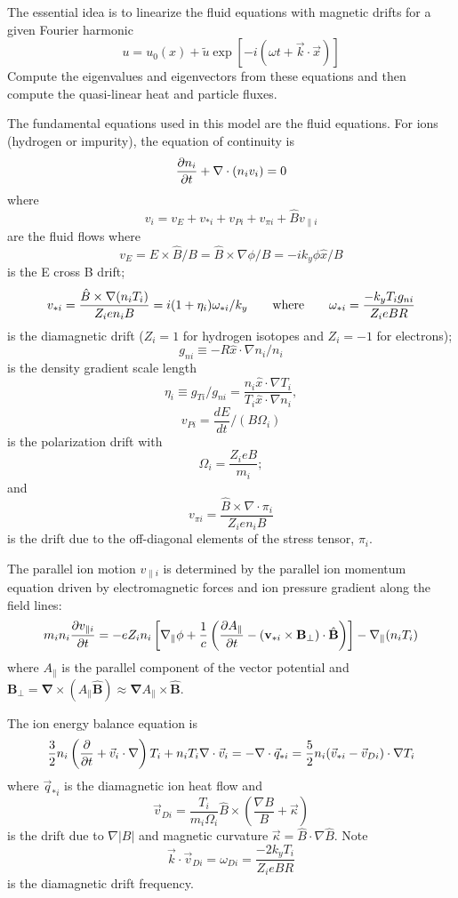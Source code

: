 The essential idea is to linearize the fluid equations 
with magnetic drifts for a given Fourier harmonic
\[ u = u_0(x) + \tilde{u} \exp\left[ -i (\omega t
   + \vec{k} \cdot \vec{x} ) \right] \]
Compute the eigenvalues and eigenvectors from these equations and then
compute the quasi-linear heat and particle fluxes.


The fundamental equations used in this model are the fluid equations.
For ions (hydrogen or impurity), the equation of continuity is
\[ \frac{\partial n_i}{\partial t} + \nabla \cdot ( n_i v_i ) = 0 \]
where
\[ v_i = v_E + v_{*i} + v_{Pi} + v_{\pi i}
   + \hat{B} v_{\parallel i} \]
are the fluid flows where
\[ v_E = E \times \hat{B} / B = \hat{B} \times \nabla \phi / B
 = - i k_y \phi \hat{x} / B \]
is the E cross B drift;
\[ v_{*i} = \frac{ \hat{B} \times \nabla ( n_i T_i )}{Z_i e n_i B}
 = i ( 1 + \eta_i ) \omega_{*i} / k_y \qquad{\rm where}\qquad
 \omega_{*i} = \frac{ - k_y T_i g_{ni} }{ Z_i e B R } \]
is the diamagnetic drift ($ Z_i = 1 $ for hydrogen isotopes and
$ Z_i = -1 $ for electrons);
\[ g_{ni} \equiv - R \hat{x} \cdot \nabla n_i / n_i \]
is the density gradient scale length
\[ \eta_i \equiv g_{Ti} / g_{ni}
 = \frac{n_i \hat{x} \cdot \nabla T_i}{T_i \hat{x} \cdot \nabla n_i}, \]
\[ v_{Pi} = \frac{ d E }{ dt } / ( B \Omega_i ) \]
is the polarization drift with
\[ \Omega_i = \frac{ Z_i e B }{ m_i}; \]
and
\[ v_{\pi i} = \frac{ \hat{B} \times \nabla \cdot \pi_i}{
  Z_i e n_i B } \]
is the drift due to the off-diagonal elements of the stress tensor, $\pi_i$.

The parallel ion motion $ v_{\parallel i} $ is determined by the parallel
ion momentum equation driven by electromagnetic forces and ion pressure
gradient along the field lines\cite{weil92a}:
\begin{equation}
  m_i n_i \frac{\partial v_{\parallel i}}{\partial t}
 =  - e Z_i n_i \left[ \nabla_{\parallel} \phi + \frac{1}{c} \left(
    \frac{\partial A_\parallel}{\partial t}
     - ( {\mathbf v}_{*i} \times {\mathbf B}_{\perp} ) \cdot \hat{{\mathbf B}}
         \right) \right]  - \nabla_{\parallel} ( n_i T_i ) 
\end{equation}
where $A_\parallel$ is the parallel component of the vector potential and
$ {\mathbf B}_{\perp} = {\mathbf \nabla} \times
    ( A_\parallel \hat{{\mathbf B}} )
   \approx {\mathbf \nabla} A_\parallel \times  \hat{{\mathbf B}} $.

\noindent
The ion energy balance equation is
\[ \frac{3}{2} n_i \left( \frac{\partial  }{\partial t} + \vec{v}_i \cdot \nabla \right) T_i
  + n_i T_i \nabla \cdot \vec{v}_i = - \nabla \cdot \vec{q}_{*i}
  = \frac{5}{2} n_i ( \vec{v}_{*i} - \vec{v}_{Di} ) \cdot \nabla T_i \]
where $ \vec{q}_{*i} $ is the diamagnetic ion heat flow and
\[ \vec{v}_{Di} = \frac{T_i}{m_i \Omega_i} \hat{B} \times 
  \left( \frac{\nabla B}{B} + \vec{\kappa} \right) \]
is the drift due to $\nabla |B|$ and magnetic curvature
$ \vec{\kappa} = \hat{B} \cdot \nabla \hat{B} $.  Note
\[ \vec{k} \cdot \vec{v}_{Di} = \omega_{Di} = \frac{-2 k_y T_i}{Z_i e B R} \]
is the diamagnetic drift frequency.

